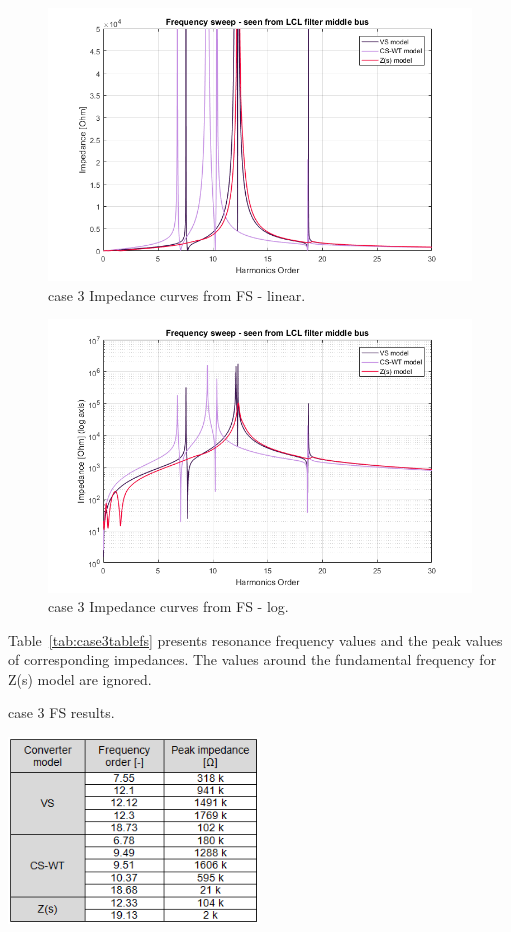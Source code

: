 \documentclass[12pt]{report} %
\begin{document}
\begin{figure}[htb]
	\centering
	\includegraphics[width=1\textwidth]{img/Case3/Case3_FS_lin.png}
  	\caption{case 3 Impedance curves from FS - linear.}
  	\label{fig:case3fslin}
\end{figure}
\FloatBarrier

\begin{figure}[htb]
	\centering
	\includegraphics[width=1\textwidth]{img/Case3/Case3_FS_log.png}
  	\caption{case 3 Impedance curves from FS - log.}
  	\label{fig:case3fslog}
\end{figure}
\FloatBarrier

Table~\ref{tab:case3tablefs} presents resonance frequency values and the peak values of corresponding impedances. The values around the fundamental frequency for Z(s) model are ignored.

\begin{table}[htb]
	\centering
	\caption{case 3 FS results.}
	\label{tab:case3tablefs}
	\includegraphics[width=0.5\textwidth]{img/Case3/table_FS.png}
\end{table}
\FloatBarrier
\end{document}
